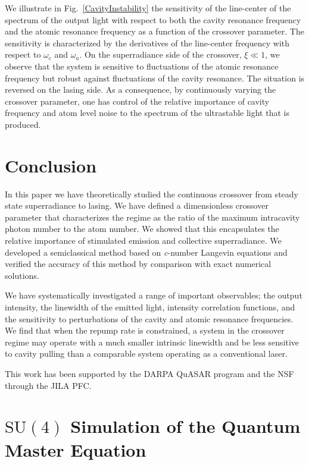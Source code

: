 \documentclass[aps,
twocolumn,
showpacs,
superscriptaddress,groupedaddress]{revtex4}
\begin{document}
We illustrate in Fig.~\ref{CavityInstability} the sensitivity of the
line-center of the spectrum of the output light with respect to both
the cavity resonance frequency and the atomic resonance frequency as a
function of the crossover parameter. The sensitivity is characterized
by the derivatives of the line-center frequency with respect to
$\omega_c$ and $\omega_a$.  On the superradiance side of the
crossover, $\xi \ll 1$, we observe that the system is sensitive to
fluctuations of the atomic resonance frequency but robust against
fluctuations of the cavity resonance. The situation is reversed on the
lasing side. As a consequence, by continuously varying the crossover
parameter, one has control of the relative importance of cavity
frequency and atom level noise to the spectrum of the ultrastable
light that is produced.


\section{Conclusion}

In this paper we have theoretically studied the continuous crossover
from steady state superradiance to lasing.  We have defined a
dimensionless crossover parameter that characterizes the regime as the
ratio of the maximum intracavity photon number to the atom number. We
showed that this encapsulates the relative importance of stimulated
emission and collective superradiance. We developed a semiclassical
method based on \textit{c}-number Langevin equations and verified the
accuracy of this method by comparison with exact numerical solutions.

We have systematically investigated a range of important observables;
the output intensity, the linewidth of the emitted light, intensity
correlation functions, and the sensitivity to perturbations of the
cavity and atomic resonance frequencies.  We find that when the repump
rate is constrained, a system in the crossover regime may operate with a
much smaller intrinsic linewidth and be less sensitive to cavity pulling
than a comparable system operating as a conventional laser.

\begin{acknowledgments}
This work has been supported by the DARPA QuASAR program and the NSF
through the JILA PFC\@.
\end{acknowledgments}


\appendix

\section{$\mathrm{SU}(4)$ Simulation of the Quantum Master Equation}
\label{Su4Appendix}
\end{document}

